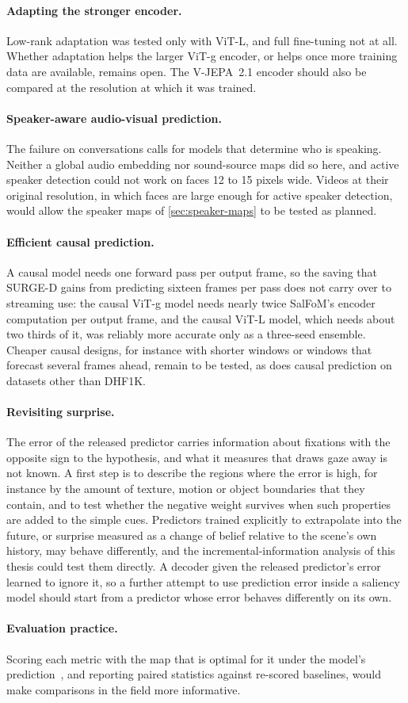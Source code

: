 \paragraph{Adapting the stronger encoder.} Low-rank adaptation was tested only
with \acrshort{ViT}-L, and full fine-tuning not at all. Whether adaptation helps the larger
\acrshort{ViT}-g encoder, or helps once more training data are available, remains open.
The \acrshort{V-JEPA}~2.1 encoder should also be compared at the resolution at which it
was trained.

\paragraph{Speaker-aware audio-visual prediction.} The failure on conversations
calls for models that determine who is speaking. Neither a global audio
embedding nor sound-source maps did so here, and active speaker detection
could not work on faces 12 to 15 pixels wide. Videos at their original
resolution, in which faces are large enough for active speaker detection, would
allow the speaker maps of \cref{sec:speaker-maps} to be tested as planned.

\paragraph{Efficient causal prediction.} A causal model needs one forward pass
per output frame, so the saving that SURGE-D gains from predicting sixteen
frames per pass does not carry over to streaming use: the causal \acrshort{ViT}-g model
needs nearly twice SalFoM's encoder computation per output frame, and the
causal \acrshort{ViT}-L model, which needs about two thirds of it, was reliably more
accurate only as a three-seed ensemble. Cheaper causal designs, for instance
with shorter windows or windows that forecast several frames ahead, remain to be
tested, as does causal prediction on datasets other than DHF1K.

\paragraph{Revisiting surprise.} The error of the released predictor carries
information about fixations with the opposite sign to the hypothesis, and what
it measures that draws gaze away is not known. A first step is to describe the
regions where the error is high, for instance by the amount of texture, motion
or object boundaries that they contain, and to test whether the negative weight
survives when such properties are added to the simple cues. Predictors trained
explicitly to extrapolate into the future, or surprise measured as a change of
belief relative to the scene's own history, may behave differently, and the
incremental-information analysis of this thesis could test them directly. A
decoder given the released predictor's error learned to ignore it, so a
further attempt to use prediction error inside a saliency model should start
from a predictor whose error behaves differently on its own.

\paragraph{Evaluation practice.} Scoring each metric with the map that is optimal
for it under the model's prediction~\cite{kummerer2018saliency}, and reporting
paired statistics against re-scored baselines, would make comparisons in the
field more informative.

